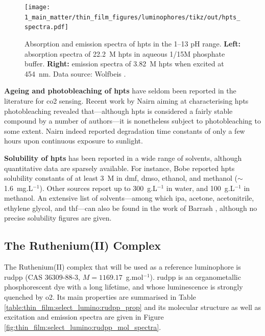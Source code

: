 \begin{figure}
	\centering
	\texttt{[image: 1\_main\_matter/thin\_film\_figures/luminophores/tikz/out/hpts\_spectra.pdf]}
	\caption[Absorption and emission spectra of \gls{hpts} in the 1--13 pH range.]{Absorption and emission spectra of \gls{hpts} in the 1--13 pH range. \textbf{Left:} absorption spectra of 22.2~\textmu{}M \gls{hpts} in aqueous 1/15M phosphate buffer. \textbf{Right:} emission spectra of 3.82~\textmu{}M \gls{hpts} when excited at 454~nm. Data source: Wolfbeis \etal{}\cite{wolfbeis1983}.}
	\label{fig:thin_film:select_lumino:hpts_spectra}
\end{figure}

\textbf{Ageing and photobleaching of \gls{hpts}} have seldom been reported in the literature for \gls{co2} sensing\cite{borisov2007}. Recent work by Nairn \etal{}\cite{nairn2015} aiming at characterising \gls{hpts} photobleaching revealed that---although \gls{hpts} is considered a fairly stable compound by a number of authors\cite{wolfbeis1998, bultzingslowen2002, cajlakovic2006}---it is nonetheless subject to photobleaching to some extent. Nairn \etal{} indeed reported degradation time constants of only a few hours upon continuous exposure to sunlight.

\textbf{Solubility of \gls{hpts}} has been reported in a wide range of solvents, although quantitative data are sparsely available. For instance, Bobe \etal{} reported \gls{hpts} solubility constants of at least 3~{\textmu}M in \gls{dmf}, \gls{dmso}, ethanol, and methanol\cite{bobe2014} ($\sim$1.6~mg.L$^{-1}$). Other sources report up to 300~g.L$^{-1}$ in water, and 100~g.L$^{-1}$ in methanol\cite{chembookpyranine}. An extensive list of solvents---among which \gls{ipa}, acetone, acetonitrile, ethylene glycol, and \gls{thf}---can also be found in the work of Barrash \etal{}\cite{barrash1998}, although no precise solubility figures are given.

\subsection{The Ruthenium(II) Complex}\label{subsect:thin_film:select_lumino:rudpp}

The Ruthenium(II) complex that will be used as a reference luminophore is \gls{rudpp} (CAS 36309-88-3, $M=1169.17$~g.mol$^{-1}$). \gls{rudpp} is an organometallic phosphorescent dye with a long lifetime, and whose luminescence is strongly quenched by \gls{o2}. Its main properties are summarised in Table \ref{table:thin_film:select_lumino:rudpp_prop} and its molecular structure as well as excitation and emission spectra are given in Figure \ref{fig:thin_film:select_lumino:rudpp_mol_spectra}.

